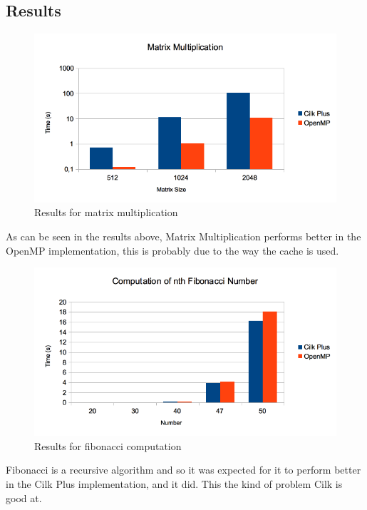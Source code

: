 \documentclass[a4paper,10pt,openright,openbib,twocolumn]{article}
\begin{document}
\subsection{Results}

        \begin{figure}[htb]
            \centering
            \includegraphics[scale=0.35]{../pres/images/matrix.png}
            \caption{Results for matrix multiplication}
            \label{roofline}
        \end{figure}
        As can be seen in the results above, Matrix Multiplication performs better in the OpenMP implementation, this is probably due to the way the cache is used.\\

        \begin{figure}[htb]
            \centering
            \includegraphics[scale=0.35]{../pres/images/fib.png}
            \caption{Results for fibonacci computation}
            \label{roofline}
        \end{figure}
        Fibonacci is a recursive algorithm and so it was expected for it to perform better in the Cilk Plus implementation, and it did. This the kind of problem Cilk is good at. \\
\end{document}
